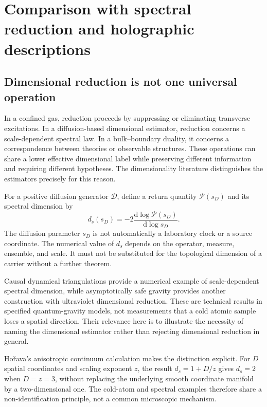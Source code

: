 \documentclass[11pt,a4paper]{article}
\theoremstyle{definition}
\theoremstyle{remark}
\newcommand{\dd}{\mathrm{d}}
\begin{document}
\section{Comparison with spectral reduction and holographic descriptions}
\label{sec:comparisons}
\subsection{Dimensional reduction is not one universal operation}
In a confined gas, reduction proceeds by suppressing or eliminating transverse excitations. In a diffusion-based dimensional estimator, reduction concerns a scale-dependent spectral law. In a bulk--boundary duality, it concerns a correspondence between theories or observable structures. These operations can share a lower effective dimensional label while preserving different information and requiring different hypotheses. The dimensionality literature distinguishes the estimators precisely for this reason.\cite{carlip}

For a positive diffusion generator $\mathcal D$, define a return quantity $\mathcal P(s_D)$ and its spectral dimension by
\begin{equation}
 d_s(s_D)=-2\frac{\dd\log\mathcal P(s_D)}{\dd\log s_D}.
 \label{eq:spectral_dimension}
\end{equation}
The diffusion parameter $s_D$ is not automatically a laboratory clock or a source coordinate. The numerical value of $d_s$ depends on the operator, measure, ensemble, and scale. It must not be substituted for the topological dimension of a carrier without a further theorem.\cite{carlip,planck}

Causal dynamical triangulations provide a numerical example of scale-dependent spectral dimension, while asymptotically safe gravity provides another construction with ultraviolet dimensional reduction. These are technical results in specified quantum-gravity models, not measurements that a cold atomic sample loses a spatial direction. Their relevance here is to illustrate the necessity of naming the dimensional estimator rather than rejecting dimensional reduction in general.\cite{cdt,reuter}

Ho\v rava's anisotropic continuum calculation makes the distinction explicit. For $D$ spatial coordinates and scaling exponent $z$, the result $d_s=1+D/z$ gives $d_s=2$ when $D=z=3$, without replacing the underlying smooth coordinate manifold by a two-dimensional one. The cold-atom and spectral examples therefore share a non-identification principle, not a common microscopic mechanism.\cite{horava}
\end{document}
